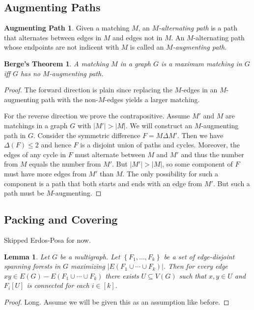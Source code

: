 \documentclass[12pt]{article}
\theoremstyle{plain}
\newtheorem{lem}[thm]{Lemma}
\newtheorem*{Berge}{Berge's Theorem}
\theoremstyle{definition}
\newtheorem*{AugmentingPath}{Augmenting Path}
\theoremstyle{remark}
\newcommand{\set}[1]{\left\{ #1 \right\}}
\newcommand{\card}[1]{\left|#1\right|}
\begin{document}
\subsection{Augmenting Paths}
\begin{AugmentingPath}
Given a matching $M$, an \emph{$M$-alternating path} is a path that alternates
between edges in $M$ and edges not in $M$.  An $M$-alternating path whose endpoints are not indicent with $M$ is called an \emph{$M$-augmenting path}.
\end{AugmentingPath}
\begin{Berge}
A matching $M$ in a graph $G$ is a maximum matching in $G$ iff $G$ has no $M$-augmenting path.
\end{Berge}
\begin{proof}
The forward direction is plain since replacing the $M$-edges in an $M$-augmenting path with the non-$M$-edges yields a larger matching.

For the reverse direction we prove the contrapositive. Assume $M'$ and $M$ are matchings in a graph $G$ with $\card{M'} > \card{M}$.  We will construct an $M$-augmenting path in $G$.  Consider the symmetric difference $F = M \Delta M'$.  Then we have $\Delta(F) \leq 2$ and hence $F$ is a disjoint union of paths and cycles.  Moreover, the edges of any cycle in $F$ must alternate between $M$ and $M'$ and thus the number from $M$ equals the number from $M'$.  But $\card{M'} > \card{M}$, so some component of $F$ must have more edges from $M'$ than $M$.  The only possibility for such a component is a path that both starts and ends with an edge from $M'$.  But such a path must be $M$-augmenting.
\end{proof}

\subsection{Packing and Covering}
Skipped Erdos-Posa for now.

\begin{lem}\label{TreePackingHelper}
Let $G$ be a multigraph.  Let $\set{F_1, \ldots, F_k}$ be a set of edge-disjoint spanning forests in $G$ maximizing $\card{E(F_1 \cup \cdots \cup F_k)}$.  Then for every edge $xy \in E(G) - E(F_1 \cup \cdots \cup F_k)$ there exists $U \subseteq V(G)$ such that $x,y \in U$ and $F_i[U]$ is connected for each $i \in [k]$.
\end{lem}
\begin{proof}
Long.  Assume we will be given this as an assumption like before.
\end{proof}
\end{document}
